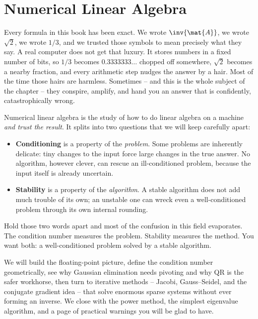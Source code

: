 \chapter{Numerical Linear Algebra}

Every formula in this book has been exact. We wrote $\inv{\mat{A}}$, we wrote
$\sqrt{2}$, we wrote $1/3$, and we trusted those symbols to mean precisely what they
say. A real computer does not get that luxury. It stores numbers in a fixed number of
bits, so $1/3$ becomes $0.3333333\ldots$ chopped off somewhere, $\sqrt{2}$ becomes a
nearby fraction, and every arithmetic step nudges the answer by a hair. Most of the
time those hairs are harmless. Sometimes -- and this is the whole subject of the
chapter -- they conspire, amplify, and hand you an answer that is confidently,
catastrophically wrong.

Numerical linear algebra is the study of how to do linear algebra on a machine
\emph{and trust the result}. It splits into two questions that we will keep carefully
apart:

\begin{itemize}
  \item \textbf{Conditioning} is a property of the \emph{problem}. Some problems are
    inherently delicate: tiny changes to the input force large changes in the true
    answer. No algorithm, however clever, can rescue an ill-conditioned problem,
    because the input itself is already uncertain.
  \item \textbf{Stability} is a property of the \emph{algorithm}. A stable algorithm
    does not add much trouble of its own; an unstable one can wreck even a
    well-conditioned problem through its own internal rounding.
\end{itemize}

Hold those two words apart and most of the confusion in this field evaporates. The
condition number measures the problem. Stability measures the method. You want both:
a well-conditioned problem solved by a stable algorithm.

We will build the floating-point picture, define the condition number geometrically,
see why Gaussian elimination needs pivoting and why QR is the safer workhorse, then
turn to iterative methods -- Jacobi, Gauss--Seidel, and the conjugate gradient idea --
that solve enormous sparse systems without ever forming an inverse. We close with the
power method, the simplest eigenvalue algorithm, and a page of practical warnings you
will be glad to have.

